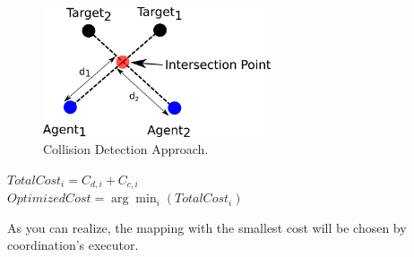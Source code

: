 \begin{figure}[t!]
\centering
  \includegraphics[width=0.6\textwidth]{Chapter4/figures/AvoidCollision.pdf}
  \caption{Collision Detection Approach.} 
  \label{fig:AvoidCollision}
\end{figure}

\begin{center}
$TotalCost_{i} = C_{d,i}+C_{c,i}$\\
$Optimized Cost = \arg\min_{i}(TotalCost_{i})$
\end{center}
As you can realize, the mapping with the smallest cost will be chosen by coordination's executor.


